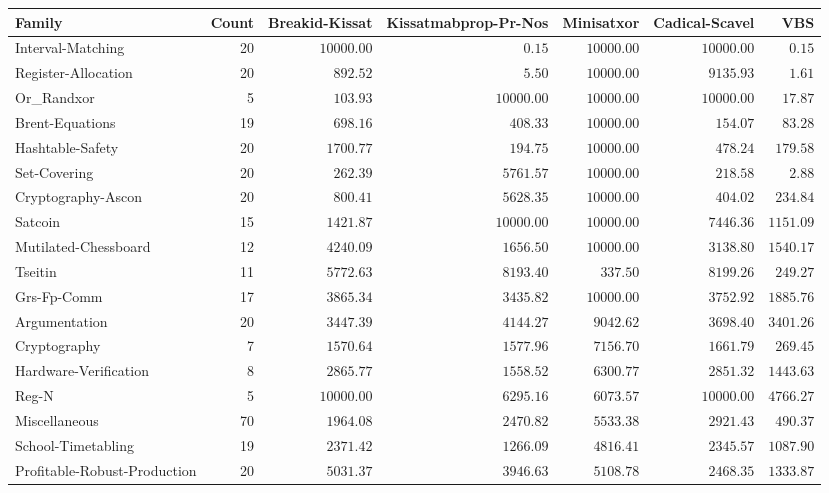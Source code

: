 \begin{tabular}{lr|rrrr|r}
\toprule
Family & Count & Breakid-Kissat & Kissatmabprop-Pr-Nos & Minisatxor & Cadical-Scavel & VBS \\
\midrule
Interval-Matching & 20 & $10000.00$ & \bfseries $0.15$ & $10000.00$ & $10000.00$ & $0.15$ \\
Register-Allocation & 20 & $892.52$ & \bfseries $5.50$ & $10000.00$ & $9135.93$ & $1.61$ \\
Or\_Randxor & 5 & \bfseries $103.93$ & $10000.00$ & $10000.00$ & $10000.00$ & $17.87$ \\
Brent-Equations & 19 & $698.16$ & $408.33$ & $10000.00$ & \bfseries $154.07$ & $83.28$ \\
Hashtable-Safety & 20 & $1700.77$ & \bfseries $194.75$ & $10000.00$ & $478.24$ & $179.58$ \\
Set-Covering & 20 & $262.39$ & $5761.57$ & $10000.00$ & \bfseries $218.58$ & $2.88$ \\
Cryptography-Ascon & 20 & $800.41$ & $5628.35$ & $10000.00$ & \bfseries $404.02$ & $234.84$ \\
Satcoin & 15 & \bfseries $1421.87$ & $10000.00$ & $10000.00$ & $7446.36$ & $1151.09$ \\
Mutilated-Chessboard & 12 & $4240.09$ & \bfseries $1656.50$ & $10000.00$ & $3138.80$ & $1540.17$ \\
Tseitin & 11 & $5772.63$ & $8193.40$ & \bfseries $337.50$ & $8199.26$ & $249.27$ \\
Grs-Fp-Comm & 17 & $3865.34$ & \bfseries $3435.82$ & $10000.00$ & $3752.92$ & $1885.76$ \\
Argumentation & 20 & \bfseries $3447.39$ & $4144.27$ & $9042.62$ & $3698.40$ & $3401.26$ \\
Cryptography & 7 & \bfseries $1570.64$ & $1577.96$ & $7156.70$ & $1661.79$ & $269.45$ \\
Hardware-Verification & 8 & $2865.77$ & \bfseries $1558.52$ & $6300.77$ & $2851.32$ & $1443.63$ \\
Reg-N & 5 & $10000.00$ & $6295.16$ & \bfseries $6073.57$ & $10000.00$ & $4766.27$ \\
Miscellaneous & 70 & \bfseries $1964.08$ & $2470.82$ & $5533.38$ & $2921.43$ & $490.37$ \\
School-Timetabling & 19 & $2371.42$ & \bfseries $1266.09$ & $4816.41$ & $2345.57$ & $1087.90$ \\
Profitable-Robust-Production & 20 & $5031.37$ & $3946.63$ & $5108.78$ & \bfseries $2468.35$ & $1333.87$ \\

\end{tabular}
